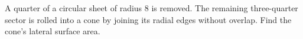 A quarter of a circular sheet of radius $8$ is removed. The remaining three-quarter sector is rolled into a cone by joining its radial edges without overlap. Find the cone's lateral surface area.
